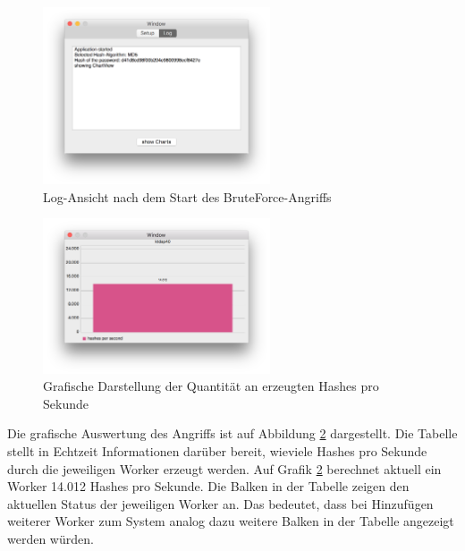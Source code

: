\begin{figure}[!ht]
	\centering
		\includegraphics[natwidth=1200pt, natheight=349pt, width=0.6\textwidth]{images/logView.png}
		\caption{Log-Ansicht nach dem Start des BruteForce-Angriffs}
	\label{fig:logView}
\end{figure}

\begin{figure}[!ht]
	\centering
		\includegraphics[natwidth=1200pt, natheight=349pt, width=0.6\textwidth]{images/chartView.png}
		\caption{Grafische Darstellung der Quantität an erzeugten Hashes pro Sekunde}
	\label{fig:chartView}
\end{figure}

Die grafische Auswertung des Angriffs ist auf Abbildung \ref{fig:chartView} dargestellt. Die Tabelle stellt in Echtzeit Informationen darüber bereit, wieviele Hashes pro Sekunde durch die jeweiligen Worker erzeugt werden. Auf Grafik \ref{fig:chartView} berechnet aktuell ein Worker 14.012 Hashes pro Sekunde. Die Balken in der Tabelle zeigen den aktuellen Status der jeweiligen Worker an. Das bedeutet, dass bei Hinzufügen weiterer Worker zum System analog dazu weitere Balken in der Tabelle angezeigt werden würden. 

